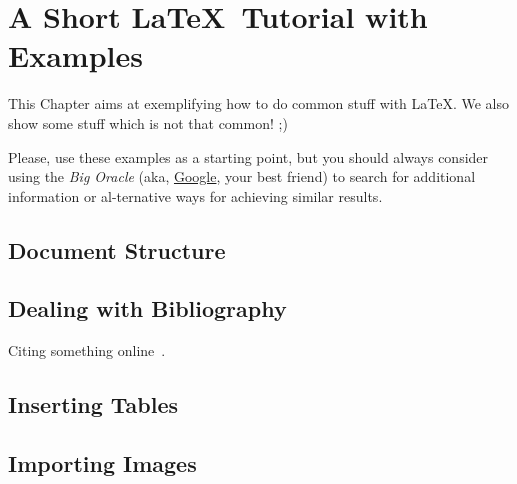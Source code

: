 
%

\chapter{A Short \LaTeX\ Tutorial with Examples}
\label{cha:a_short_latex_tutorial_with_examples}

This Chapter aims at exemplifying how to do common stuff with \LaTeX. We also show some stuff which is not that common! ;)

Please, use these examples as a starting point, but you should always consider using the \emph{Big Oracle} (aka, \href{http://www.google.com}{Google}, your best friend) to search for additional information or al-ternative ways for achieving similar results.

\section{Document Structure} %
\label{sec:document_structure}



\section{Dealing with Bibliography} %
\label{sec:dealing_with_bibliography}

Citing something online~\cite{wiki:shuntingyard,flex,bison}.



\section{Inserting Tables} %
\label{sec:inserting_tables}



\section{Importing Images} %
\label{sec:importing_images}



